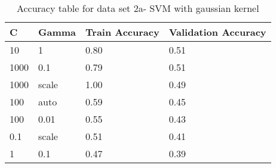 \def\arraystretch{1.25}
\begin{table}[H]
\centering
\begin{tabular}{l l l l}
\hline
\hline
\textbf{C} & \textbf{Gamma} & \textbf{Train Accuracy} & \textbf{Validation Accuracy}\\
\hline
\hline
10 & 1 & 0.80 & 0.51  \\
1000 & 0.1 & 0.79 & 0.51  \\
1000 & scale & 1.00 & 0.49 \\
100 & auto & 0.59 & 0.45 \\
100 & 0.01 & 0.55 & 0.43 \\
0.1 & scale & 0.51 & 0.41 \\
1 & 0.1 & 0.47 & 0.39 \\ 
\hline
\end{tabular}
\caption{Accuracy table for data set 2a- SVM with gaussian kernel}
\end{table}